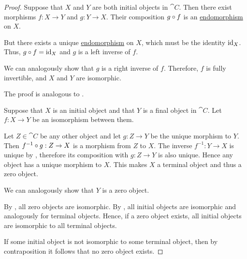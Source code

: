 \begin{proof}
   Suppose that \( X \) and \( Y \) are both initial objects in \( \cat{C} \). Then there exist morphisms \( f: X \to Y \) and \( g: Y \to X \). Their composition \( g \bincirc f \) is an \hyperref[def:morphism_invertibility/endomorphism]{endomorphism} on \( X \).

  But there exists a unique \hyperref[def:morphism_invertibility/endomorphism]{endomorphism} on \( X \), which must be the identity \( \operatorname{id}_X \). Thus, \( g \bincirc f = \id_X \) and \( g \) is a left inverse of \( f \).

  We can analogously show that \( g \) is a right inverse of \( f \). Therefore, \( f \) is fully invertible, and \( X \) and \( Y \) are isomorphic.

   The proof is analogous to .

   Suppose that \( X \) is an initial object and that \( Y \) is a final object in \( \cat{C} \). Let \( f: X \to Y \) be an isomorphism between them.

  Let \( Z \in \cat{C} \) be any other object and let \( g: Z \to Y \) be the unique morphism to \( Y \). Then \( f^{-1} \bincirc g: Z \to X \) is a morphism from \( Z \) to \( X \). The inverse \( f^{-1}: Y \to X \) is unique by , therefore its composition with \( g: Z \to Y \) is also unique. Hence any object has a unique morphism to \( X \). This makes \( X \) a terminal object and thus a zero object.

  We can analogously show that \( Y \) is a zero object.

   By , all zero objects are isomorphic. By , all initial objects are isomorphic and analogously for terminal objects. Hence, if a zero object exists, all initial objects are isomorphic to all terminal objects.

  If some initial object is not isomorphic to some terminal object, then by contraposition it follows that no zero object exists.
\end{proof}

